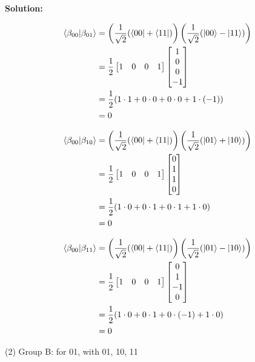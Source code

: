 \documentclass[11pt]{article}
\newenvironment{solution}
{\par\noindent\textbf{Solution:}\par}
{\vspace{1em}}
\begin{document}
\begin{solution}
\[\begin{aligned}
\braket{\beta_{00}}{\beta_{01}} &= \left(\frac{1}{\sqrt{2}}(\bra{00} + \bra{11})\right) \left(\frac{1}{\sqrt{2}}(\ket{00} - \ket{11})\right) \\
&= \frac{1}{2} \begin{bmatrix}1&0&0&1\end{bmatrix} \begin{bmatrix}1\\0\\0\\-1\end{bmatrix} \\
&= \frac{1}{2} (1 \cdot 1 + 0 \cdot 0 + 0 \cdot 0 + 1 \cdot (-1)) \\
&= 0
\end{aligned}\]

\[\begin{aligned}
\braket{\beta_{00}}{\beta_{10}} &= \left(\frac{1}{\sqrt{2}}(\bra{00} + \bra{11})\right) \left(\frac{1}{\sqrt{2}}(\ket{01} + \ket{10})\right) \\
&= \frac{1}{2} \begin{bmatrix}1&0&0&1\end{bmatrix} \begin{bmatrix}0\\1\\1\\0\end{bmatrix} \\
&= \frac{1}{2} (1 \cdot 0 + 0 \cdot 1 + 0 \cdot 1 + 1 \cdot 0) \\
&= 0
\end{aligned}\]

\[\begin{aligned}
\braket{\beta_{00}}{\beta_{11}} &= \left(\frac{1}{\sqrt{2}}(\bra{00} + \bra{11})\right) \left(\frac{1}{\sqrt{2}}(\ket{01} - \ket{10})\right) \\
&= \frac{1}{2} \begin{bmatrix}1&0&0&1\end{bmatrix} \begin{bmatrix}0\\1\\-1\\0\end{bmatrix} \\
&= \frac{1}{2} (1 \cdot 0 + 0 \cdot 1 + 0 \cdot (-1) + 1 \cdot 0) \\
&= 0
\end{aligned}\]

(2) Group B: for 01, with 01, 10, 11


\end{solution}
\end{document}
